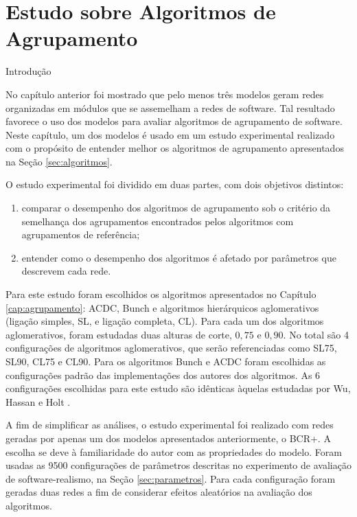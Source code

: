 
\chapter{Estudo sobre Algoritmos de Agrupamento} \label{cap:estudo}

\begin{section}{Introdução}

No capítulo anterior foi mostrado que pelo menos três modelos geram redes organizadas em módulos que se assemelham a redes de software. Tal resultado favorece o uso dos modelos para avaliar algoritmos de agrupamento de software. Neste capítulo, um dos modelos é usado em um estudo experimental realizado com o propósito de entender melhor os algoritmos de agrupamento apresentados na Seção \ref{sec:algoritmos}.

O estudo experimental foi dividido em duas partes, com dois objetivos distintos:
\begin{enumerate}
	\item comparar o desempenho dos algoritmos de agrupamento sob o critério da semelhança dos agrupamentos encontrados pelos algoritmos com agrupamentos de referência;
	\item entender como o desempenho dos algoritmos é afetado por parâmetros que descrevem cada rede.
\end{enumerate}

Para este estudo foram escolhidos os algoritmos apresentados no Capítulo \ref{cap:agrupamento}: ACDC, Bunch e algoritmos hierárquicos aglomerativos (ligação simples, SL, e ligação completa, CL). Para cada um dos algoritmos aglomerativos, foram estudadas duas alturas de corte, $0,75$ e $0,90$. No total são 4 configurações de algoritmos aglomerativos, que serão referenciadas como SL75, SL90, CL75 e CL90. Para os algoritmos Bunch e ACDC foram escolhidas as configurações padrão das implementações dos autores dos algoritmos. As 6 configurações escolhidas para este estudo são idênticas àquelas estudadas por Wu, Hassan e Holt \cite{Wu2005}.

A fim de simplificar as análises, o estudo experimental foi realizado com redes geradas por apenas um dos modelos apresentados anteriormente, o BCR+. A escolha se deve à familiaridade do autor com as propriedades do modelo. Foram usadas as 9500 configurações de parâmetros descritas no experimento de avaliação de software-realismo, na Seção \ref{sec:parametros}. Para cada configuração foram geradas duas redes a fim de considerar efeitos aleatórios na avaliação dos algoritmos.


\end{section}


